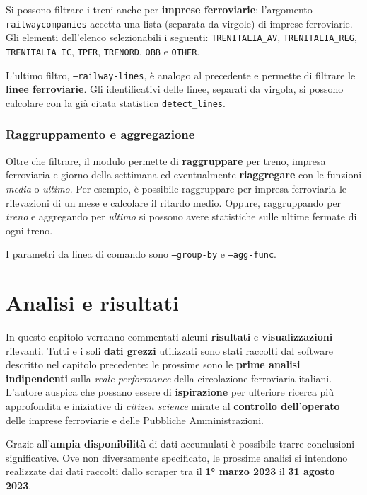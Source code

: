\documentclass[12pt,italian]{report}
\begin{document}
Si possono filtrare i treni anche per \textbf{imprese ferroviarie}:
l'argomento \texttt{--railway\-companies} accetta una lista (separata
da virgole) di imprese ferroviarie.  Gli elementi dell'elenco
selezionabili i seguenti: \texttt{TRENITALIA\_\-AV},
\texttt{TRENITALIA\_\-REG}, \texttt{TRENITALIA\_\-IC}, \texttt{TPER},
\texttt{TRENORD}, \texttt{OBB} e \texttt{OTHER}.

L'ultimo filtro, \texttt{--railway\--lines}, è analogo al precedente e
permette di filtrare le \textbf{linee ferroviarie}.  Gli
identificativi delle linee, separati da virgola, si possono calcolare
con la già citata statistica \texttt{detect\-\_lines}.

\subsection{Raggruppamento e aggregazione}

Oltre che filtrare, il modulo permette di \textbf{raggruppare} per
treno, impresa ferroviaria e giorno della settimana ed eventualmente
\textbf{riaggregare} con le funzioni \textit{media} o \textit{ultimo}.
Per esempio, è possibile raggruppare per impresa ferroviaria le
rilevazioni di un mese e calcolare il ritardo medio.  Oppure,
raggruppando per \textit{treno} e aggregando per \textit{ultimo} si
possono avere statistiche sulle ultime fermate di ogni treno.

I parametri da linea di comando sono \texttt{--group\--by} e
\texttt{--agg\--func}.

\chapter{Analisi e risultati}

In questo capitolo verranno commentati alcuni \textbf{risultati} e
\textbf{visualizzazioni} rilevanti.  Tutti e i soli \textbf{dati
    grezzi} utilizzati sono stati raccolti dal software descritto nel
capitolo precedente: le prossime sono le \textbf{prime analisi
    indipendenti} sulla \textit{reale performance} della circolazione
ferroviaria italiani.  L'autore auspica che possano essere di
\textbf{ispirazione} per ulteriore ricerca più approfondita e
iniziative di \textit{citizen science} mirate al \textbf{controllo
    dell'operato} delle imprese ferroviarie e delle Pubbliche
Amministrazioni.

Grazie all'\textbf{ampia disponibilità} di dati accumulati è possibile
trarre conclusioni significative.  Ove non diversamente specificato,
le prossime analisi si intendono realizzate dai dati raccolti dallo
scraper tra il \textbf{1° marzo 2023} il \textbf{31 agosto 2023}.
\end{document}

